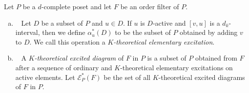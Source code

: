 \documentclass[ALCO,ThmDefs,Unicode,epreuves]{cedram}
\newcommand\EE{\mathcal{E}}
\begin{document}
\begin{defi}
\label{def:K-excited}
Let $P$ be a $d$-complete poset and let $F$ be an order filter of $P$.
\begin{enumerate}[(a)]
\item~\label{defi3.9_a} %
Let $D$ be a subset of $P$ and $u \in D$.
If $u$ is $D$-active and $[v,u]$ is a $d_k$-interval, 
then we define $\alpha^*_u(D)$ to be the subset of $P$ obtained by 
adding $v$ to $D$.
We call this operation a \emph{$K$-theoretical elementary excitation}.
\item~\label{defi3.9_b} %
A \emph{$K$-theoretical excited diagram} of $F$ in $P$ is a subset of $P$ 
obtained from $F$ after a sequence of ordinary and $K$-theoretical elementary excitations on active elements. 
Let $\EE^*_P(F)$ be the set of all $K$-theoretical excited diagrams of $F$ in $P$.
\end{enumerate}
\end{defi}
\end{document}
